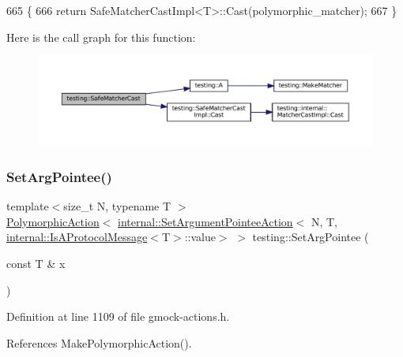 \begin{DoxyCode}
665                                                                 \{
666   \textcolor{keywordflow}{return} SafeMatcherCastImpl<T>::Cast(polymorphic\_matcher);
667 \}
\end{DoxyCode}
Here is the call graph for this function\+:
\nopagebreak
\begin{figure}[H]
\begin{center}
\leavevmode
\includegraphics[width=350pt]{namespacetesting_ac016ac22aa065a19b9ef95f0ccffc17b_cgraph}
\end{center}
\end{figure}
\mbox{\label{namespacetesting_a5740a5033b88c37666fcd09a269d123f}} 
\subsubsection{\texorpdfstring{Set\+Arg\+Pointee()}{SetArgPointee()}\hspace{0.1cm}{\footnotesize\ttfamily [1/3]}}
{\footnotesize\ttfamily template$<$size\+\_\+t N, typename T $>$ \\
\hyperlink{classtesting_1_1PolymorphicAction}{Polymorphic\+Action}$<$ \hyperlink{classtesting_1_1internal_1_1SetArgumentPointeeAction}{internal\+::\+Set\+Argument\+Pointee\+Action}$<$ N, T, \hyperlink{structtesting_1_1internal_1_1IsAProtocolMessage}{internal\+::\+Is\+A\+Protocol\+Message}$<$T$>$\+::value$>$ $>$ testing\+::\+Set\+Arg\+Pointee (\begin{DoxyParamCaption}\item[{const T \&}]{x }\end{DoxyParamCaption})}



Definition at line 1109 of file gmock-\/actions.\+h.



References Make\+Polymorphic\+Action().


